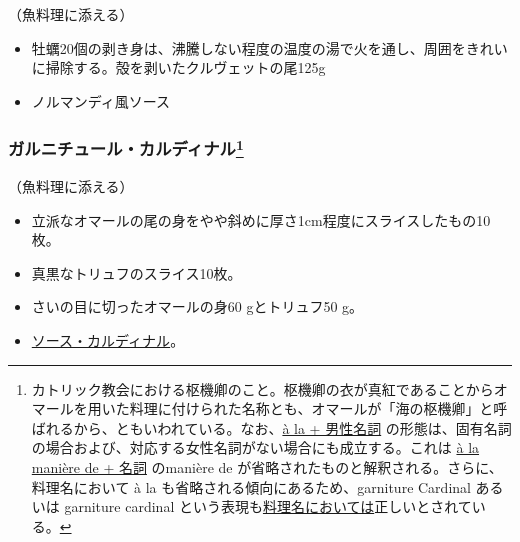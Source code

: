 \begin{recette}
（魚料理に添える）

\begin{itemize}
\item
  牡蠣20個の剥き身は、沸騰しない程度の温度の湯で火を通し、周囲をきれいに掃除する。殻を剥いたクルヴェットの尾125g
\item
  ノルマンディ風ソース
\end{itemize}

\atoaki{}

\hypertarget{garniture-cardinal}{%
\subsubsection[ガルニチュール・カルディナル]{\texorpdfstring{ガルニチュール・カルディナル\footnote{カトリック教会における枢機卿のこと。枢機卿の衣が真紅であることからオマールを用いた料理に付けられた名称とも、オマールが「海の枢機卿」と呼ばれるから、ともいわれている。なお、\ul{à la + 男性名詞}
  の形態は、固有名詞の場合および、対応する女性名詞がない場合にも成立する。これは
  \ul{à la manière de + 名詞} のmanière de
  が省略されたものと解釈される。さらに、料理名において à la
  も省略される傾向にあるため、garniture Cardinal あるいは garniture
  cardinal という表現も\ul{料理名においては}正しいとされている。}}{ガルニチュール・カルディナル}}\label{garniture-cardinal}}


（魚料理に添える）

\begin{itemize}
\item
  立派なオマールの尾の身をやや斜めに厚さ1cm程度にスライスしたもの10枚。
\item
  真黒なトリュフのスライス10枚。
\item
  さいの目に切ったオマールの身60 gとトリュフ50 g。
\item
  \protect\hyperlink{sauce-cardinal}{ソース・カルディナル}。
\end{itemize}

\atoaki{}

\hypertarget{garniture-castillane}{%
}
\end{recette}
